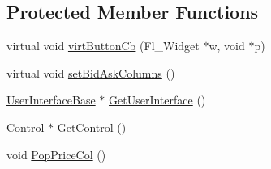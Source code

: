 \subsection*{Protected Member Functions}
\begin{DoxyCompactItemize}
\item 
virtual void \hyperlink{class_mike_1_1_widget_table_affddec39940626f7d72ffaf9e02d04e4}{virt\+Button\+Cb} (Fl\+\_\+\+Widget $\ast$w, void $\ast$p)
\item 
virtual void \hyperlink{class_mike_1_1_widget_table_ae788064f6ed7b19e9ac42b717ff53567}{set\+Bid\+Ask\+Columns} ()
\item 
\hyperlink{class_mike_1_1_user_interface_base}{User\+Interface\+Base} $\ast$ \hyperlink{class_mike_1_1_widget_table_a62d2aadd2ee9f9e9f376dd597b5dcd7b}{Get\+User\+Interface} ()
\item 
\hyperlink{class_mike_1_1_control}{Control} $\ast$ \hyperlink{class_mike_1_1_widget_table_ad5fd734ccfa48b6866554122c8b66667}{Get\+Control} ()
\item 
void \hyperlink{class_mike_1_1_widget_table_a7c161d452ff10617cafcbc331a92a8b2}{Pop\+Price\+Col} ()
\end{DoxyCompactItemize}
